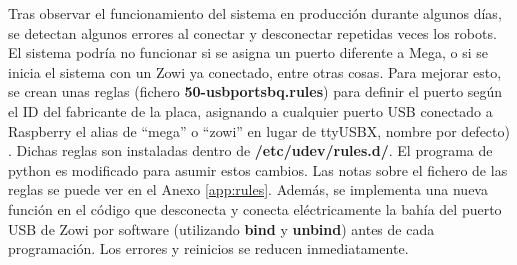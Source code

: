 Tras observar el funcionamiento del sistema en producción durante algunos días, se detectan algunos errores al conectar y desconectar repetidas veces los robots. El sistema podría no funcionar si se asigna un puerto diferente a Mega, o si se inicia el sistema con un Zowi ya conectado, entre otras cosas. Para mejorar esto, se crean unas reglas (fichero \textbf{50-usbportsbq.rules}) para definir el puerto según el ID del fabricante de la placa, asignando a cualquier puerto USB conectado a Raspberry el alias de “mega” o “zowi” en lugar de ttyUSBX, nombre por defecto) . Dichas reglas son instaladas dentro de \textbf{/etc/udev/rules.d/}. El programa de python es modificado para asumir estos cambios. Las notas sobre el fichero de las reglas se puede ver en el Anexo \ref{app:rules}. Además, se implementa una nueva función en el código que desconecta y conecta eléctricamente la bahía del puerto USB de Zowi por software (utilizando \textbf{bind} y \textbf{unbind}) antes de cada programación. Los errores y reinicios se reducen inmediatamente.
